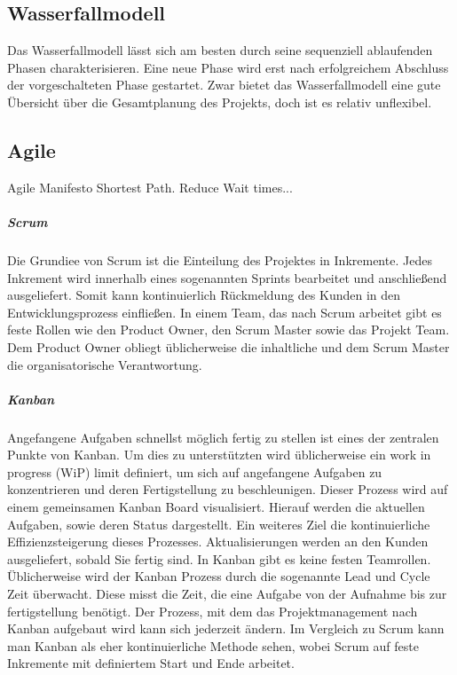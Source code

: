 \documentclass[twocolumn,10pt]{asme2ej}
\begin{document}
\subsection{Wasserfallmodell}
Das Wasserfallmodell lässt sich am besten durch seine sequenziell ablaufenden Phasen charakterisieren. Eine neue Phase wird erst nach erfolgreichem Abschluss der vorgeschalteten Phase gestartet. Zwar bietet das Wasserfallmodell eine gute Übersicht über die Gesamtplanung des Projekts, doch ist es relativ unflexibel.

\subsection{Agile}
Agile Manifesto\cite{beck2001agile}
Shortest Path. Reduce Wait times...


\subparagraph{Scrum}
Die Grundiee von Scrum ist die Einteilung des Projektes in Inkremente. Jedes Inkrement wird innerhalb eines sogenannten Sprints bearbeitet und anschließend ausgeliefert. Somit kann kontinuierlich Rückmeldung des Kunden in den Entwicklungsprozess einfließen. In einem Team, das nach Scrum arbeitet gibt es feste Rollen wie den Product Owner, den Scrum Master sowie das Projekt Team. Dem Product Owner obliegt üblicherweise die inhaltliche und dem Scrum Master die organisatorische Verantwortung.

\subparagraph{Kanban}
Angefangene Aufgaben schnellst möglich fertig zu stellen ist eines der zentralen Punkte von Kanban. Um dies zu unterstützten wird üblicherweise ein work in progress (WiP) limit definiert, um sich auf angefangene Aufgaben zu konzentrieren und deren Fertigstellung zu beschleunigen. Dieser Prozess wird auf einem gemeinsamen Kanban Board visualisiert. Hierauf werden die aktuellen Aufgaben, sowie deren Status dargestellt. Ein weiteres Ziel die kontinuierliche Effizienzsteigerung dieses Prozesses.\cite{kanban} Aktualisierungen werden an den Kunden ausgeliefert, sobald Sie fertig sind. In Kanban gibt es keine festen Teamrollen. Üblicherweise wird der Kanban Prozess durch die sogenannte Lead und Cycle Zeit überwacht. Diese misst die Zeit, die eine Aufgabe von der Aufnahme bis zur fertigstellung benötigt. Der Prozess, mit dem das Projektmanagement nach Kanban aufgebaut wird kann sich jederzeit ändern. Im Vergleich zu Scrum kann man Kanban als eher kontinuierliche Methode sehen, wobei Scrum auf feste Inkremente mit definiertem Start und Ende arbeitet.
\end{document}
